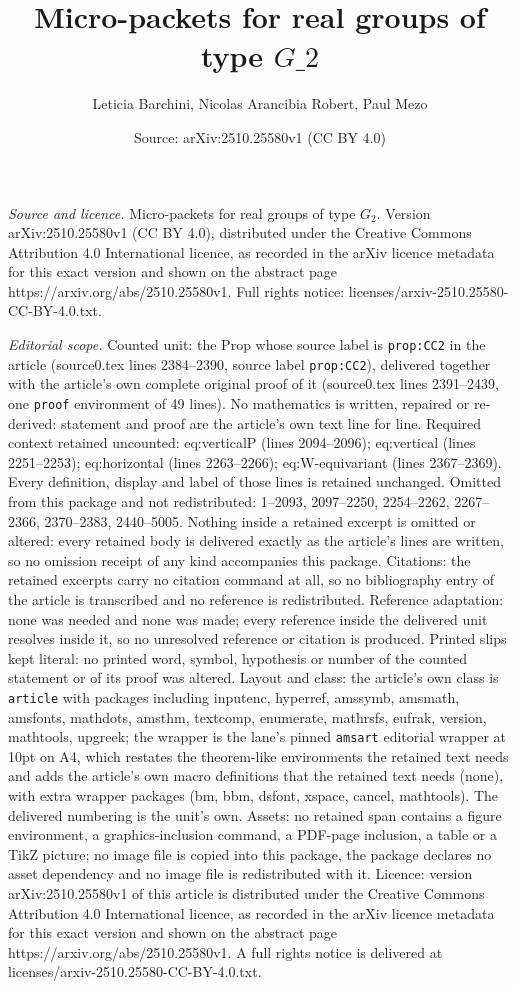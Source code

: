 \documentclass[10pt,a4paper]{amsart}
\title[Micro-packets for real groups of type $G\_2$]{Micro-packets for real groups of type $G\_2$}
\author{Leticia Barchini, Nicolas Arancibia Robert, Paul Mezo}
\date{Source: arXiv:2510.25580v1 (CC BY 4.0)}
\begin{document}
\maketitle

\noindent\emph{Source and licence.} Micro-packets for real groups of type $G_2$. Version arXiv:2510.25580v1 (CC BY 4.0), distributed under the Creative Commons Attribution 4.0 International licence, as recorded in the arXiv licence metadata for this exact version and shown on the abstract page https://arxiv.org/abs/2510.25580v1. Full rights notice: licenses/arxiv-2510.25580-CC-BY-4.0.txt.\par\smallskip

\noindent\textit{Editorial scope.} Counted unit: the Prop whose source label is \texttt{prop:CC2} in the article (source0.tex lines 2384--2390, source label \texttt{prop:CC2}), delivered together with the article's own complete original proof of it (source0.tex lines 2391--2439, one \texttt{proof} environment of 49 lines). No mathematics is written, repaired or re-derived: statement and proof are the article's own text line for line. Required context retained uncounted: eq:verticalP (lines 2094--2096); eq:vertical (lines 2251--2253); eq:horizontal (lines 2263--2266); eq:W-equivariant (lines 2367--2369). Every definition, display and label of those lines is retained unchanged. Omitted from this package and not redistributed: 1--2093, 2097--2250, 2254--2262, 2267--2366, 2370--2383, 2440--5005. Nothing inside a retained excerpt is omitted or altered: every retained body is delivered exactly as the article's lines are written, so no omission receipt of any kind accompanies this package. Citations: the retained excerpts carry no citation command at all, so no bibliography entry of the article is transcribed and no reference is redistributed. Reference adaptation: none was needed and none was made; every reference inside the delivered unit resolves inside it, so no unresolved reference or citation is produced. Printed slips kept literal: no printed word, symbol, hypothesis or number of the counted statement or of its proof was altered. Layout and class: the article's own class is \texttt{article} with packages including inputenc, hyperref, amssymb, amsmath, amsfonts, mathdots, amsthm, textcomp, enumerate, mathrsfs, eufrak, version, mathtools, upgreek; the wrapper is the lane's pinned \texttt{amsart} editorial wrapper at 10pt on A4, which restates the theorem-like environments the retained text needs and adds the article's own macro definitions that the retained text needs (none), with extra wrapper packages (bm, bbm, dsfont, xspace, cancel, mathtools). The delivered numbering is the unit's own. Assets: no retained span contains a figure environment, a graphics-inclusion command, a PDF-page inclusion, a table or a TikZ picture; no image file is copied into this package, the package declares no asset dependency and no image file is redistributed with it. Licence: version arXiv:2510.25580v1 of this article is distributed under the Creative Commons Attribution 4.0 International licence, as recorded in the arXiv licence metadata for this exact version and shown on the abstract page https://arxiv.org/abs/2510.25580v1. A full rights notice is delivered at licenses/arxiv-2510.25580-CC-BY-4.0.txt. 
\end{document}
